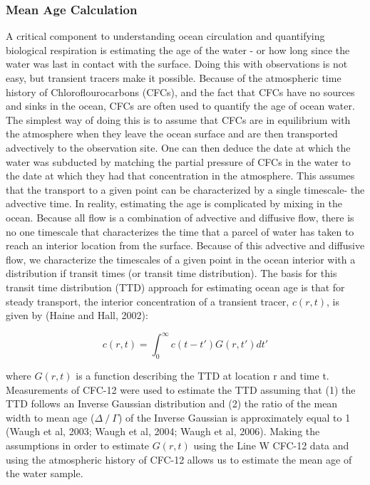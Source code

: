 \subsubsection{Mean Age Calculation}
A critical component to understanding ocean circulation and quantifying biological respiration is estimating the age of the water - or how long since the water was last in contact with the surface. Doing this with observations is not easy, but transient tracers make it possible. Because of the atmospheric time history of Chloroflourocarbons (CFCs), and the fact that CFCs have no sources and sinks in the ocean, CFCs are often used to quantify the age of ocean water. The simplest way of doing this is to assume that CFCs are in equilibrium with the atmosphere when they leave the ocean surface and are then transported advectively to the observation site. One can then deduce the date at which the water was subducted by matching the partial pressure of CFCs in the water to the date at which they had that concentration in the atmosphere.  This assumes that the transport to a given point can be characterized by a single timescale- the advective time.
In reality, estimating the age is complicated by mixing in the ocean. Because all flow is a combination of advective and diffusive flow, there is no one timescale that characterizes the time that a parcel of water has taken to reach an interior location from the surface. Because of this advective and diffusive flow, we characterize the timescales of a given point in the ocean interior with a distribution if transit times (or transit time distribution).
	The basis for this transit time distribution (TTD) approach for estimating ocean age is that for steady transport, the interior concentration of a transient tracer, $c(r,t)$, is given by (Haine and Hall, 2002):

\begin{equation}
	c(r,t) = \int_{0}^{\infty}c(t-t')G(r,t')dt'
\end{equation}

where $G(r,t)$ is a function describing the TTD at location r and time t. Measurements of CFC-12 were used to estimate the TTD assuming that (1) the TTD follows an Inverse Gaussian distribution and (2) the ratio of the mean width to mean age ($\Delta⁄\Gamma$) of the Inverse Gaussian is approximately equal to 1 (Waugh et al, 2003; Waugh et al, 2004; Waugh et al, 2006). Making the assumptions in order to estimate $G(r,t)$ using the Line W CFC-12 data and using the atmospheric history of CFC-12 allows us to estimate the mean age of the water sample.

